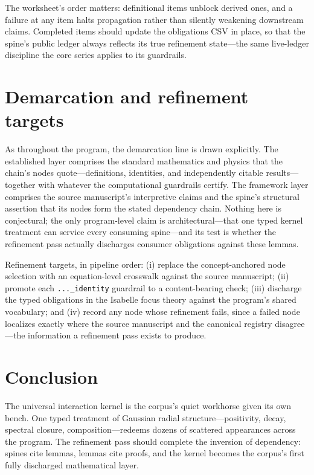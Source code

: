 \documentclass[11pt]{article}
\theoremstyle{remark}
\begin{document}
The worksheet's order matters: definitional items unblock derived ones, and a failure at any item halts propagation rather than silently weakening downstream claims. Completed items should update the obligations CSV in place, so that the spine's public ledger always reflects its true refinement state---the same live-ledger discipline the core series applies to its guardrails.

\section{Demarcation and refinement targets}
\label{sec:demarc}

As throughout the program, the demarcation line is drawn explicitly. The established layer comprises the standard mathematics and physics that the chain's nodes quote---definitions, identities, and independently citable results---together with whatever the computational guardrails certify. The framework layer comprises the source manuscript's interpretive claims and the spine's structural assertion that its nodes form the stated dependency chain. Nothing here is conjectural; the only program-level claim is architectural---that one typed kernel treatment can service every consuming spine---and its test is whether the refinement pass actually discharges consumer obligations against these lemmas.

Refinement targets, in pipeline order: (i) replace the concept-anchored node selection with an equation-level crosswalk against the source manuscript; (ii) promote each \texttt{...\_identity} guardrail to a content-bearing check; (iii) discharge the typed obligations in the Isabelle focus theory against the program's shared vocabulary; and (iv) record any node whose refinement fails, since a failed node localizes exactly where the source manuscript and the canonical registry disagree---the information a refinement pass exists to produce.

\section{Conclusion}
\label{sec:conc}

The universal interaction kernel is the corpus's quiet workhorse given its own bench. One typed treatment of Gaussian radial structure---positivity, decay, spectral closure, composition---redeems dozens of scattered appearances across the program. The refinement pass should complete the inversion of dependency: spines cite lemmas, lemmas cite proofs, and the kernel becomes the corpus's first fully discharged mathematical layer.
\end{document}
